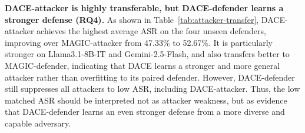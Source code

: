 \documentclass{article}
\newcommand{\method}{\textsc{DACE}\xspace}
\begin{document}
\textbf{\method-attacker is highly transferable, but \method-defender learns a stronger defense (RQ4).}
As shown in Table~\ref{tab:attacker-transfer}, \method-attacker achieves the highest average ASR on the four unseen defenders, improving over MAGIC-attacker from 47.33\% to 52.67\%. It is particularly stronger on Llama3.1-8B-IT and Gemini-2.5-Flash, and also transfers better to MAGIC-defender, indicating that \method learns a stronger and more general attacker rather than overfitting to its paired defender. However, \method-defender still suppresses all attackers to low ASR, including \method-attacker. Thus, the low matched ASR should be interpreted not as attacker weakness, but as evidence that \method-defender learns an even stronger defense from a more diverse and capable adversary.
\end{document}
